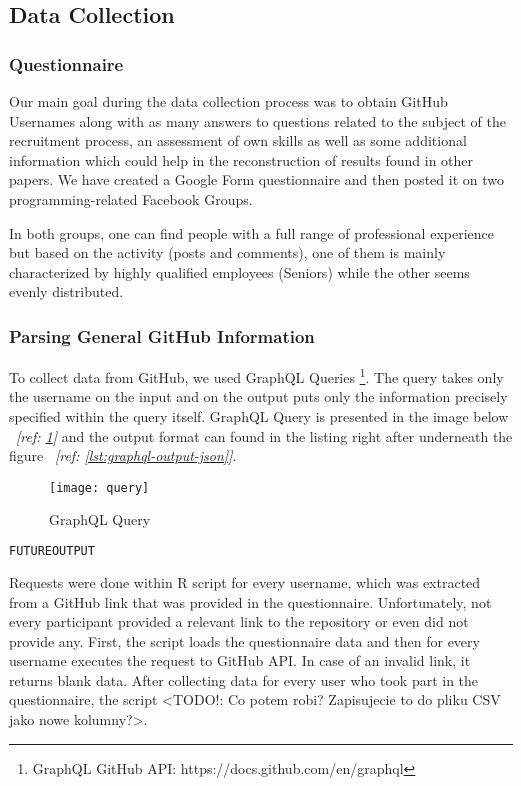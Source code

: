 \subsection{Data Collection}
\label{sec:data-collection}

\subsubsection{Questionnaire}
\label{sec:questionnaire}

Our main goal during the data collection process was to obtain GitHub Usernames along with as many answers to questions related to the subject of the recruitment process, an assessment of own skills as well as some additional information which could help in the reconstruction of results found in other papers. We have created a Google Form questionnaire and then posted it on two programming-related Facebook Groups.

In both groups, one can find people with a full range of professional experience but based on the activity (posts and comments), one of them is mainly characterized by highly qualified employees (Seniors) while the other seems evenly distributed.

\subsubsection{Parsing General GitHub Information}
\label{sec:github-info-parsing}

To collect data from GitHub, we used GraphQL Queries \footnote{GraphQL GitHub API: https://docs.github.com/en/graphql}. The query takes only the username on the input and on the output puts only the information precisely specified within the query itself. GraphQL Query is presented in the image below ~\textit{[ref: \ref{fig:graph-ql-query}]} and the output format can found in the listing right after underneath the figure ~\textit{[ref: \ref{lst:graphql-output-json}]}.

\begin{figure}[htp]
\centering
\texttt{[image: query]}
\caption{GraphQL Query}
\label{fig:graph-ql-query}
\end{figure}

\begin{lstlisting}[language=Python, label={lst:graphql-output-json}]
FUTUREOUTPUT
\end{lstlisting} 

Requests were done within R script for every username, which was extracted from a GitHub link that was provided in the questionnaire. Unfortunately, not every participant provided a relevant link to the repository or even did not provide any. First, the script loads the questionnaire data and then for every username executes the request to GitHub API. In case of an invalid link, it returns blank data. After collecting data for every user who took part in the questionnaire, the script <TODO!: Co potem robi? Zapisujecie to do pliku CSV jako nowe kolumny?>.


